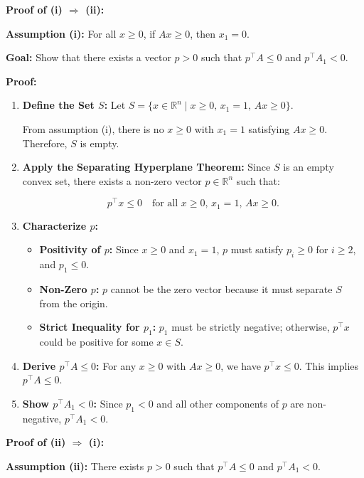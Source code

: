 \documentclass[12pt,letterpaper]{article}
\begin{document}
\textbf{Proof of (i) $\Rightarrow$ (ii):}

\textbf{Assumption (i):} For all $x \geq 0$, if $Ax \geq 0$, then $x_1 = 0$.

\textbf{Goal:} Show that there exists a vector $p > 0$ such that $p^\top A \leq 0$ and $p^\top A_1 < 0$.

\textbf{Proof:}

\begin{enumerate}
    \item \textbf{Define the Set $S$:}
    Let $S = \{ x \in \mathbb{R}^n \mid x \geq 0, \, x_1 = 1, \, Ax \geq 0 \}$.
    
    From assumption (i), there is no $x \geq 0$ with $x_1 = 1$ satisfying $Ax \geq 0$. Therefore, $S$ is empty.

    \item \textbf{Apply the Separating Hyperplane Theorem:}
    Since $S$ is an empty convex set, there exists a non-zero vector $p \in \mathbb{R}^n$ such that:
    
    \[p^\top x \leq 0 \quad \text{for all } x \geq 0, \, x_1 = 1, \, Ax \geq 0.\]

    \item \textbf{Characterize $p$:}
    \begin{itemize}
        \item \textbf{Positivity of $p$:}
        Since $x \geq 0$ and $x_1 = 1$, $p$ must satisfy $p_i \geq 0$ for $i \geq 2$, and $p_1 \leq 0$.
        \item \textbf{Non-Zero $p$:}
        $p$ cannot be the zero vector because it must separate $S$ from the origin.
        \item \textbf{Strict Inequality for $p_1$:}
        $p_1$ must be strictly negative; otherwise, $p^\top x$ could be positive for some $x \in S$.
    \end{itemize}

    \item \textbf{Derive $p^\top A \leq 0$:}
    For any $x \geq 0$ with $Ax \geq 0$, we have $p^\top x \leq 0$. This implies $p^\top A \leq 0$.

    \item \textbf{Show $p^\top A_1 < 0$:}
    Since $p_1 < 0$ and all other components of $p$ are non-negative, $p^\top A_1 < 0$.
\end{enumerate}

\textbf{Proof of (ii) $\Rightarrow$ (i):}

\textbf{Assumption (ii):} There exists $p > 0$ such that $p^\top A \leq 0$ and $p^\top A_1 < 0$.
\end{document}
